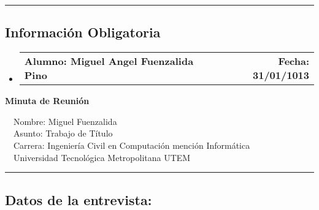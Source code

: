 \documentclass[10pt,letterpaper]{article}
\makeatletter
\newcommand{\headerrow}[2]
{\begin{tabular*}{\linewidth}{l@{\extracolsep{\fill}}r}
	#1 &
	#2 \\
\end{tabular*}}
\makeatother
\begin{document}
\hrule
\vspace{-0.4em}
\subsection*{Información Obligatoria}

\begin{itemize}
	\parskip=0.1em

	\item 
	\headerrow
		{\textbf{Alumno: Miguel Angel Fuenzalida Pino}}
		{\textbf{Fecha: 31/01/1013}}

\end{itemize}
\newpage
\begin{center}
{\LARGE \textbf{Minuta de Reunión}}

\ \ \textbullet Nombre: Miguel Fuenzalida
\\
\ \ \textbullet Asunto: Trabajo de Título
\\
\ \ \textbullet Carrera: Ingeniería Civil en Computación mención Informática
\\
\ \ \textbullet Universidad Tecnológica Metropolitana UTEM
\end{center}

\hrule
\vspace{-0.4em}
\subsection*{Datos de la entrevista:}
\end{document}

